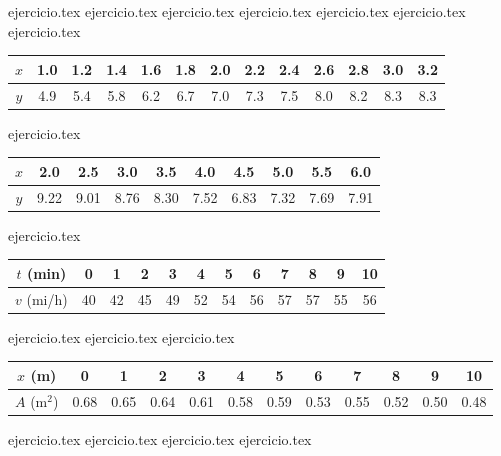 \vspace{0.5cm}
\begin{enumerate}
    \setcounter{enumi}{20}
    {ejercicio.tex}
{ejercicio.tex}
{ejercicio.tex}
{ejercicio.tex}
{ejercicio.tex}
{ejercicio.tex}
{ejercicio.tex}
\vspace{0.2cm}
    \begin{tabular}{|c|c|c|c|c|c|c|c|c|c|c|c|c|}
    \hline
    $x$ & 1.0 & 1.2 & 1.4 & 1.6 & 1.8 & 2.0 & 2.2 & 2.4 & 2.6 & 2.8 & 3.0 & 3.2 \\ \hline
    $y$ & 4.9 & 5.4 & 5.8 & 6.2 & 6.7 & 7.0 & 7.3 & 7.5 & 8.0 & 8.2 & 8.3 & 8.3 \\ \hline
    \end{tabular}
    \vspace{0.5cm}

    {ejercicio.tex}
\vspace{0.2cm}
    \begin{tabular}{|c|c|c|c|c|c|c|c|c|c|}
    \hline
    $x$ & 2.0 & 2.5 & 3.0 & 3.5 & 4.0 & 4.5 & 5.0 & 5.5 & 6.0 \\ \hline
    $y$ & 9.22 & 9.01 & 8.76 & 8.30 & 7.52 & 6.83 & 7.32 & 7.69 & 7.91 \\ \hline
    \end{tabular}
    \vspace{0.5cm}

    {ejercicio.tex}
\vspace{0.2cm}
    \begin{tabular}{|c|c|c|c|c|c|c|c|c|c|c|c|}
    \hline
    $t$ (min) & 0 & 1 & 2 & 3 & 4 & 5 & 6 & 7 & 8 & 9 & 10 \\ \hline
    $v$ (mi/h) & 40 & 42 & 45 & 49 & 52 & 54 & 56 & 57 & 57 & 55 & 56 \\ \hline
    \end{tabular}
    \vspace{0.5cm}

    {ejercicio.tex}
{ejercicio.tex}
{ejercicio.tex}
\vspace{0.2cm}
    \begin{tabular}{|c|c|c|c|c|c|c|c|c|c|c|c|}
    \hline
    $x$ (m) & 0 & 1 & 2 & 3 & 4 & 5 & 6 & 7 & 8 & 9 & 10 \\ \hline
    $A$ (m$^2$) & 0.68 & 0.65 & 0.64 & 0.61 & 0.58 & 0.59 & 0.53 & 0.55 & 0.52 & 0.50 & 0.48 \\ \hline
    \end{tabular}
    \vspace{0.5cm}

    {ejercicio.tex}
{ejercicio.tex}
{ejercicio.tex}
{ejercicio.tex}
\end{enumerate}
